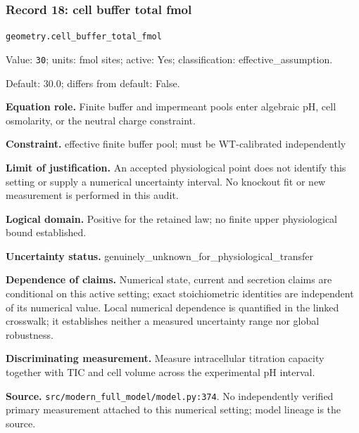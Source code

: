 \subsubsection*{Record 18: cell buffer total fmol}
{\small \nolinkurl{geometry.cell_buffer_total_fmol}\par

Value: \texttt{30}; units: fmol sites; active: Yes; classification: effective\_assumption.\par

Default: 30.0; differs from default: False.\par

\textbf{Equation role.} Finite buffer and impermeant pools enter algebraic pH, cell osmolarity, or the neutral charge constraint.\par

\textbf{Constraint.} effective finite buffer pool; must be WT-calibrated independently\par

\textbf{Limit of justification.} An accepted physiological point does not identify this setting or supply a numerical uncertainty interval. No knockout fit or new measurement is performed in this audit.\par

\textbf{Logical domain.} Positive for the retained law; no finite upper physiological bound established.\par

\textbf{Uncertainty status.} genuinely\_unknown\_for\_physiological\_transfer\par

\textbf{Dependence of claims.} Numerical state, current and secretion claims are conditional on this active setting; exact stoichiometric identities are independent of its numerical value. Local numerical dependence is quantified in the linked crosswalk; it establishes neither a measured uncertainty range nor global robustness.\par

\textbf{Discriminating measurement.} Measure intracellular titration capacity together with TIC and cell volume across the experimental pH interval.\par

\textbf{Source.} \nolinkurl{src/modern_full_model/model.py:374}. No independently verified primary measurement attached to this numerical setting; model lineage is the source.\par}

